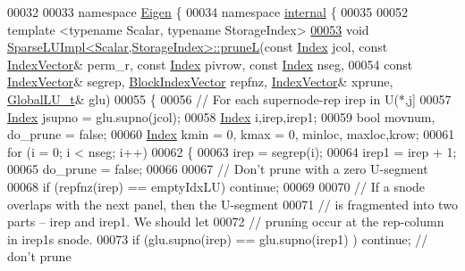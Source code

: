 \begin{DoxyCode}
00032 
00033 \textcolor{keyword}{namespace }\hyperlink{namespace_eigen}{Eigen} \{
00034 \textcolor{keyword}{namespace }\hyperlink{namespaceinternal}{internal} \{
00035 
00052 \textcolor{keyword}{template} <\textcolor{keyword}{typename} Scalar, \textcolor{keyword}{typename} StorageIndex>
\hyperlink{group___sparse_l_u___module_a350464d1c83182fbd7da8a5a74bdfde8}{00053} \textcolor{keywordtype}{void} \hyperlink{group___sparse_l_u___module_a350464d1c83182fbd7da8a5a74bdfde8}{SparseLUImpl<Scalar,StorageIndex>::pruneL}(\textcolor{keyword}{const} 
      \hyperlink{namespace_eigen_a62e77e0933482dafde8fe197d9a2cfde}{Index} jcol, \textcolor{keyword}{const} \hyperlink{group___core___module_class_eigen_1_1_matrix}{IndexVector}& perm\_r, \textcolor{keyword}{const} \hyperlink{namespace_eigen_a62e77e0933482dafde8fe197d9a2cfde}{Index} pivrow, \textcolor{keyword}{const} 
      \hyperlink{namespace_eigen_a62e77e0933482dafde8fe197d9a2cfde}{Index} nseg,
00054                                                \textcolor{keyword}{const} \hyperlink{group___core___module_class_eigen_1_1_matrix}{IndexVector}& segrep, 
      \hyperlink{group___core___module_class_eigen_1_1_ref}{BlockIndexVector} repfnz, \hyperlink{group___core___module_class_eigen_1_1_matrix}{IndexVector}& xprune, 
      \hyperlink{struct_eigen_1_1internal_1_1_l_u___global_l_u__t}{GlobalLU\_t}& glu)
00055 \{
00056   \textcolor{comment}{// For each supernode-rep irep in U(*,j]}
00057   \hyperlink{namespace_eigen_a62e77e0933482dafde8fe197d9a2cfde}{Index} jsupno = glu.supno(jcol); 
00058   \hyperlink{namespace_eigen_a62e77e0933482dafde8fe197d9a2cfde}{Index} i,irep,irep1; 
00059   \textcolor{keywordtype}{bool} movnum, do\_prune = \textcolor{keyword}{false}; 
00060   \hyperlink{namespace_eigen_a62e77e0933482dafde8fe197d9a2cfde}{Index} kmin = 0, kmax = 0, minloc, maxloc,krow; 
00061   \textcolor{keywordflow}{for} (i = 0; i < nseg; i++)
00062   \{
00063     irep = segrep(i); 
00064     irep1 = irep + 1; 
00065     do\_prune = \textcolor{keyword}{false}; 
00066     
00067     \textcolor{comment}{// Don't prune with a zero U-segment }
00068     \textcolor{keywordflow}{if} (repfnz(irep) == emptyIdxLU) \textcolor{keywordflow}{continue}; 
00069     
00070     \textcolor{comment}{// If a snode overlaps with the next panel, then the U-segment}
00071     \textcolor{comment}{// is fragmented into two parts -- irep and irep1. We should let }
00072     \textcolor{comment}{// pruning occur at the rep-column in irep1s snode. }
00073     \textcolor{keywordflow}{if} (glu.supno(irep) == glu.supno(irep1) ) \textcolor{keywordflow}{continue}; \textcolor{comment}{// don't prune }

\end{DoxyCode}
